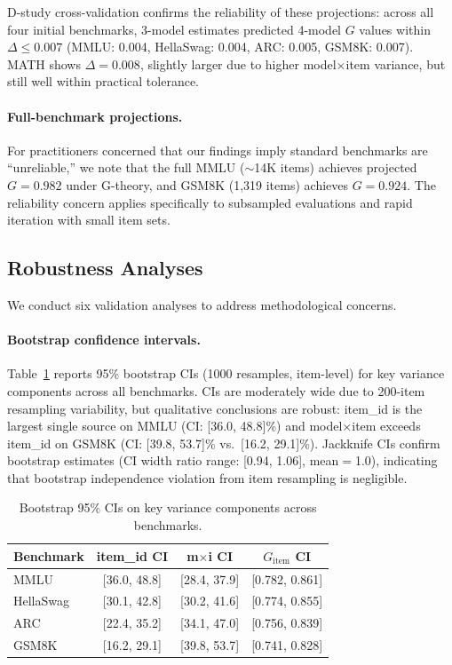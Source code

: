 \documentclass[11pt,a4paper]{article}
\newcommand{\Gcoeff}{\ensuremath{G}}
\begin{document}
D-study cross-validation confirms the reliability of these projections: across all four initial benchmarks, 3-model estimates predicted 4-model $\Gcoeff$ values within $\Delta\leq0.007$ (MMLU: 0.004, HellaSwag: 0.004, ARC: 0.005, GSM8K: 0.007).
MATH shows $\Delta=0.008$, slightly larger due to higher model$\times$item variance, but still well within practical tolerance.

\paragraph{Full-benchmark projections.}
For practitioners concerned that our findings imply standard benchmarks are ``unreliable,'' we note that the full MMLU ($\sim$14K items) achieves projected $\Gcoeff=0.982$ under G-theory, and GSM8K (1,319 items) achieves $\Gcoeff=0.924$.
The reliability concern applies specifically to subsampled evaluations and rapid iteration with small item sets.

\subsection{Robustness Analyses}
\label{sec:robustness}

We conduct six validation analyses to address methodological concerns.

\paragraph{Bootstrap confidence intervals.}
Table~\ref{tab:bootstrap} reports 95\% bootstrap CIs (1000 resamples, item-level) for key variance components across all benchmarks.
CIs are moderately wide due to 200-item resampling variability, but qualitative conclusions are robust: item\_id is the largest single source on MMLU (CI: [36.0, 48.8]\%) and model$\times$item exceeds item\_id on GSM8K (CI: [39.8, 53.7]\% vs.\ [16.2, 29.1]\%).
Jackknife CIs confirm bootstrap estimates (CI width ratio range: [0.94, 1.06], mean$=$1.0), indicating that bootstrap independence violation from item resampling is negligible.

\begin{table}[t]
\centering
\caption{Bootstrap 95\% CIs on key variance components across benchmarks.}
\label{tab:bootstrap}
\small
\begin{tabular}{lccc}
\toprule
\textbf{Benchmark} & \textbf{item\_id CI} & \textbf{m$\times$i CI} & \textbf{$\Gcoeff_\text{item}$ CI} \\
\midrule
MMLU      & [36.0, 48.8] & [28.4, 37.9] & [0.782, 0.861] \\
HellaSwag & [30.1, 42.8] & [30.2, 41.6] & [0.774, 0.855] \\
ARC       & [22.4, 35.2] & [34.1, 47.0] & [0.756, 0.839] \\
GSM8K     & [16.2, 29.1] & [39.8, 53.7] & [0.741, 0.828] \\
\bottomrule
\end{tabular}
\end{table}
\end{document}
